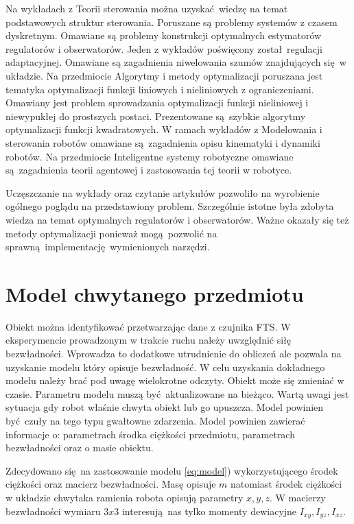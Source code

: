 \documentclass[12pt,a4paper]{article}
\begin{document}
	Na wykładach z Teorii sterowania można uzyskać wiedzę na temat podstawowych struktur sterowania. Poruszane są problemy systemów z czasem dyskretnym. Omawiane są problemy konstrukcji optymalnych estymatorów regulatorów i obserwatorów. Jeden z wykładów poświęcony został regulacji adaptacyjnej. Omawiane są zagadnienia niwelowania szumów znajdujących się w układzie. 	Na przedmiocie Algorytmy i metody optymalizacji poruszana jest tematyka optymalizacji funkcji liniowych i nieliniowych z ograniczeniami. Omawiany jest problem sprowadzania optymalizacji funkcji nieliniowej i niewypukłej do prostszych postaci. Prezentowane są szybkie algorytmy optymalizacji funkcji kwadratowych. W ramach wykładów z  Modelowania i sterowania robotów omawiane są zagadnienia opisu kinematyki i dynamiki robotów. Na przedmiocie Inteligentne systemy robotyczne omawiane są zagadnienia teorii agentowej i zastosowania tej teorii w robotyce.

	Uczęszczanie na wykłady oraz czytanie artykułów pozwoliło na wyrobienie ogólnego poglądu na przedstawiony problem. Szczególnie istotne była zdobyta wiedza na temat optymalnych regulatorów i obserwatorów. Ważne okazały się też metody optymalizacji ponieważ mogą pozwolić na sprawną implementację wymienionych narzędzi.


	\section{Model chwytanego przedmiotu}
	Obiekt można identyfikować przetwarzając dane z czujnika FTS. W eksperymencie prowadzonym w trakcie ruchu należy uwzględnić siłę bezwładności. Wprowadza to dodatkowe utrudnienie do obliczeń ale pozwala na uzyskanie modelu który opisuje bezwładność. W celu uzyskania dokładnego modelu należy brać pod uwagę wielokrotne odczyty. Obiekt może się zmieniać w czasie. Parametru modelu muszą być aktualizowane na bieżąco. Wartą uwagi jest sytuacja gdy robot właśnie chwyta obiekt lub go upuszcza. Model powinien być czuły na tego typu gwałtowne zdarzenia. Model powinien zawierać informacje o: parametrach środka ciężkości przedmiotu, parametrach bezwładności oraz o masie obiektu.

	Zdecydowano się na zastosowanie modelu \ref{eq:model}) wykorzystującego środek ciężkości oraz macierz bezwładności. Masę opisuje $m$ natomiast środek ciężkości w układzie chwytaka ramienia robota opisują parametry $x, y, z$. W macierzy bezwładności wymiaru $3x3$ interesują nas tylko momenty dewiacyjne $I_{xy}, I_{yz}, I_{xz}$.
\end{document}
